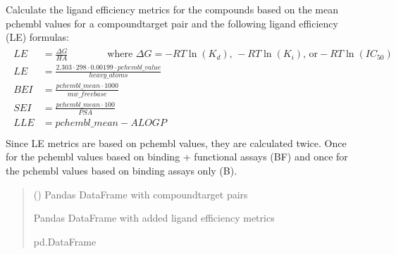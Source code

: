 \documentclass[letterpaper,10pt,english]{sphinxmanual}
\begin{document}

\begin{fulllineitems}
\label{\detokenize{add_chembl_compound_properties:add_chembl_compound_properties.add_ligand_efficiency_metrics}}
\pysigstartsignatures
{}
\pysigstopsignatures
\sphinxAtStartPar
Calculate the ligand efficiency metrics for the compounds
based on the mean pchembl values for a compound\sphinxhyphen{}target pair and the following ligand efficiency (LE) formulas:
\begin{align*}\!\begin{aligned}
LE &= \frac{\Delta G}{HA}
    \qquad \qquad \text{where } \Delta G = - RT \ln(K_d)
    \text{, } - RT\ln(K_i)
    \text{,  or} - RT\ln(IC_{50})\\
LE &= \frac{2.303 \cdot 298 \cdot 0.00199 \cdot pchembl \_ value} {heavy \_ atoms}\\
BEI &= \frac{pchembl \_ mean \cdot 1000}{mw \_ freebase}\\
SEI &= \frac{pchembl \_ mean \cdot 100}{PSA}\\
LLE &= pchembl \_ mean - ALOGP\\
\end{aligned}\end{align*}
\sphinxAtStartPar
Since LE metrics are based on pchembl values, they are calculated twice.
Once for the pchembl values based on binding + functional assays (BF)
and once for the pchembl values based on binding assays only (B).
\begin{quote}\begin{description}
\sphinxAtStartPar
{} () \textendash{} Pandas DataFrame with compound\sphinxhyphen{}target pairs

\sphinxAtStartPar
Pandas DataFrame with added ligand efficiency metrics

\sphinxAtStartPar
pd.DataFrame

\end{description}\end{quote}

\end{fulllineitems}
\end{document}
